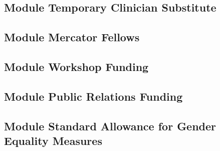 \documentclass[english, 53.01]{proposal}
\begin{document}
\subsection{Module Temporary Clinician Substitute}

\subsection{Module Mercator Fellows}

\subsection{Module Workshop Funding}

\subsection{Module Public Relations Funding}

\subsection{Module Standard Allowance for Gender Equality Measures}
\end{document}
